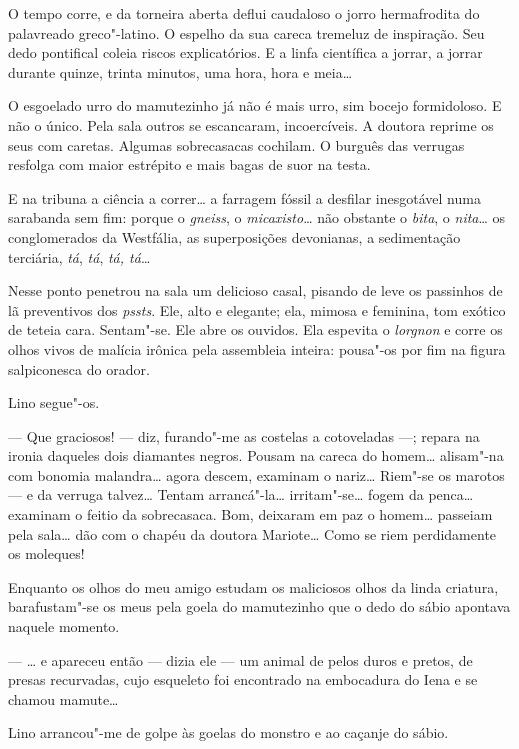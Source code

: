 O tempo corre, e da torneira aberta deflui caudaloso o jorro
hermafrodita do palavreado greco"-latino. O espelho da sua careca
tremeluz de inspiração. Seu dedo pontifical coleia riscos explicatórios.
E a linfa científica a jorrar, a jorrar durante quinze, trinta minutos,
uma hora, hora e meia\ldots{}

O esgoelado urro do mamutezinho já não é mais urro, sim bocejo
formidoloso. E não o único. Pela sala outros se escancaram,
incoercíveis. A doutora reprime os seus com caretas. Algumas
sobrecasacas cochilam. O burguês das verrugas resfolga com maior
estrépito e mais bagas de suor na testa.

E na tribuna a ciência a correr\ldots{} a farragem fóssil a desfilar
inesgotável numa sarabanda sem fim: porque o \emph{gneiss}, o
\emph{micaxisto}\ldots{} não obstante o \emph{bita}, o \emph{nita}\ldots{} os
conglomerados da Westfália, as superposições devonianas, a sedimentação
terciária, \emph{tá}, \emph{tá}, \emph{tá, tá}\ldots{}

Nesse ponto penetrou na sala um delicioso casal, pisando de leve os
passinhos de lã preventivos dos \emph{pssts}. Ele, alto e elegante; ela,
mimosa e feminina, tom exótico de teteia cara. Sentam"-se. Ele abre os
ouvidos. Ela espevita o \emph{lorgnon} e corre os olhos vivos de malícia
irônica pela assembleia inteira: pousa"-os por fim na figura salpiconesca
do orador.

Lino segue"-os.

--- Que graciosos! --- diz, furando"-me as costelas a cotoveladas ---;
repara na ironia daqueles dois diamantes negros. Pousam na careca do
homem\ldots{} alisam"-na com bonomia malandra\ldots{} agora descem, examinam o
nariz\ldots{} Riem"-se os marotos --- e da verruga talvez\ldots{} Tentam
arrancá"-la\ldots{} irritam"-se\ldots{} fogem da penca\ldots{} examinam o feitio da
sobrecasaca. Bom, deixaram em paz o homem\ldots{} passeiam pela sala\ldots{} dão
com o chapéu da doutora Mariote\ldots{} Como se riem perdidamente os
moleques!

Enquanto os olhos do meu amigo estudam os maliciosos olhos da linda
criatura, barafustam"-se os meus pela goela do mamutezinho que o dedo do
sábio apontava naquele momento.

--- \ldots{} e apareceu então --- dizia ele --- um animal de pelos duros e
pretos, de presas recurvadas, cujo esqueleto foi encontrado na
embocadura do Iena e se chamou mamute\ldots{}

Lino arrancou"-me de golpe às goelas do monstro e ao caçanje do sábio.

